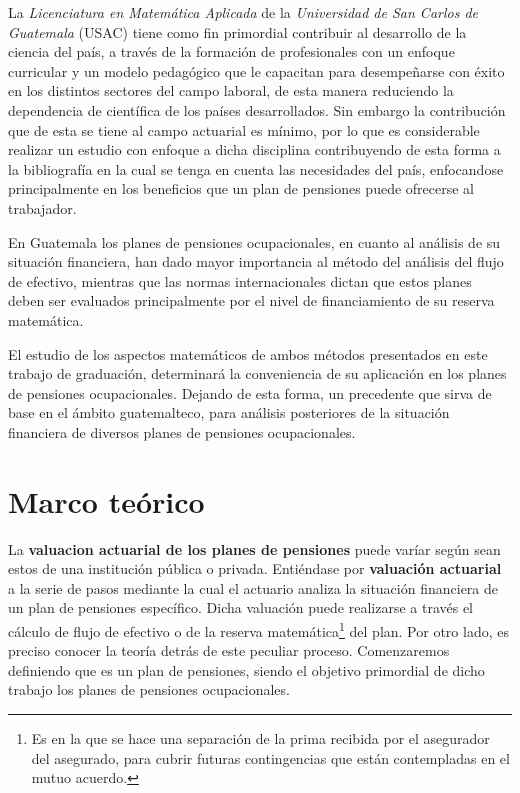 \documentclass[12pt,letterpaper,titlepage]{article}
\begin{document}
La \textit{Licenciatura en Matemática Aplicada} de la \textit{Universidad de San Carlos de Guatemala} (USAC) tiene como fin primordial contribuir al desarrollo de la ciencia del país, a través de la formación de profesionales con un enfoque curricular y un modelo pedagógico que le capacitan para desempeñarse con éxito en los distintos sectores del campo laboral, de esta manera reduciendo la dependencia de científica de los países desarrollados. Sin embargo la contribución que de esta se tiene al campo actuarial es mínimo, por lo que es considerable realizar un estudio con enfoque a dicha disciplina contribuyendo de esta forma a la bibliografía en la cual se tenga en cuenta las necesidades  del país, enfocandose principalmente en los beneficios que un plan de pensiones puede ofrecerse al trabajador. \bigskip

En Guatemala los planes de pensiones ocupacionales, en cuanto al análisis de su situación financiera, han dado mayor importancia al método del análisis del flujo de efectivo, mientras que las normas internacionales dictan que estos planes deben ser evaluados principalmente por el nivel de financiamiento de su reserva matemática.  \bigskip

El estudio de los aspectos matemáticos de ambos métodos presentados en este trabajo de graduación, determinará la conveniencia de su aplicación en los planes de pensiones ocupacionales. Dejando de esta forma, un precedente que sirva de base en el ámbito guatemalteco, para análisis posteriores de la situación financiera de diversos planes de pensiones ocupacionales.



\newpage

\section{Marco teórico}

La \textbf{valuacion actuarial de los planes de pensiones} puede varíar según sean estos de una institución pública o privada. Entiéndase por \textbf{valuación actuarial} a la serie de pasos mediante la cual el actuario analiza la situación financiera de un plan de pensiones específico. Dicha valuación puede realizarse a través el cálculo de flujo de efectivo o de la reserva matemática\footnote{Es en la que se hace una separación de la prima recibida por el asegurador del asegurado, para cubrir futuras contingencias que están contempladas en el mutuo acuerdo.} del plan. Por otro lado, es preciso conocer la teoría detrás de este peculiar proceso. Comenzaremos definiendo que es un plan de pensiones, siendo el objetivo primordial de dicho trabajo los planes de pensiones ocupacionales. 
\end{document}
